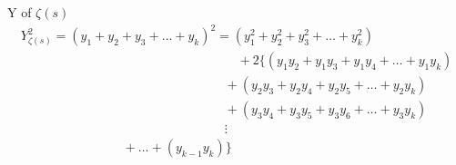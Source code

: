 \documentclass{amsart}
\begin{document}
	
	\newpage
	Y of $\zeta(s)$
	\[ \begin{array}{c}
		Y_{\zeta(s)}^2 = (y_1 + y_2 + y_3 + \dots + y_k)^2 = (y_1^2 + y_2^2 + y_3^2 + \dots + y_k^2) \\
		\qquad\qquad\qquad\qquad\qquad\qquad\qquad\qquad\quad + 2\{(y_1y_2 + y_1y_3 + y_1y_4 + \dots + y_{1}y_{k}) \\ 
		\qquad\qquad\qquad\qquad\qquad\qquad\qquad\qquad + (y_2y_3 + y_2y_4 + y_2y_5 + \dots + y_2y_{k}) \\ 
		\qquad\qquad\qquad\qquad\qquad\qquad\qquad\qquad + (y_3y_4 + y_3y_5 + y_3y_6 + \dots + y_3y_{k}) \\ 
		\qquad\qquad\qquad\qquad\qquad\qquad\qquad\qquad \vdots \\
		\qquad\qquad\qquad\qquad + \dots + (y_{k-1}y_{k}) \} \\ 
	\end{array} \]
	\[\]
	
\end{document}
